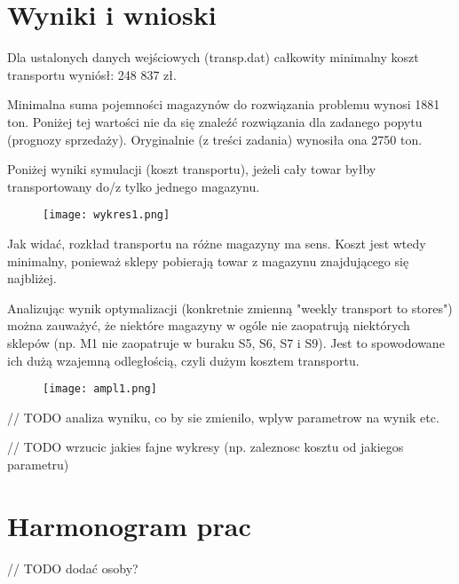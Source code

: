\documentclass{article}
\begin{document}
\section{Wyniki i wnioski}

Dla ustalonych danych wejściowych (transp.dat) całkowity minimalny koszt transportu wyniósł: 248 837 zł.

Minimalna suma pojemności magazynów do rozwiązania problemu wynosi 1881 ton. Poniżej tej wartości nie da się znaleźć rozwiązania dla zadanego popytu (prognozy sprzedaży). Oryginalnie (z treści zadania) wynosiła ona 2750 ton.

Poniżej wyniki symulacji (koszt transportu), jeżeli cały towar byłby transportowany do/z tylko jednego magazynu. 

\begin{figure}[H]
\centering
\texttt{[image: wykres1.png]}
\end{figure}

Jak widać, rozkład transportu na różne magazyny ma sens. Koszt jest wtedy minimalny, ponieważ sklepy pobierają towar z magazynu znajdującego się najbliżej.

Analizując wynik optymalizacji (konkretnie zmienną "weekly transport to stores") można zauważyć, że niektóre magazyny w ogóle nie zaopatrują niektórych sklepów (np. M1 nie zaopatruje w buraku S5, S6, S7 i S9). Jest to spowodowane ich dużą wzajemną odległością, czyli dużym kosztem transportu.

\begin{figure}[H]
\centering
\texttt{[image: ampl1.png]}
\end{figure}

// TODO analiza wyniku, co by sie zmienilo, wplyw parametrow na wynik etc.

// TODO wrzucic jakies fajne wykresy (np. zaleznosc kosztu od jakiegos parametru)

\section{Harmonogram prac}

// TODO dodać osoby?
\end{document}
